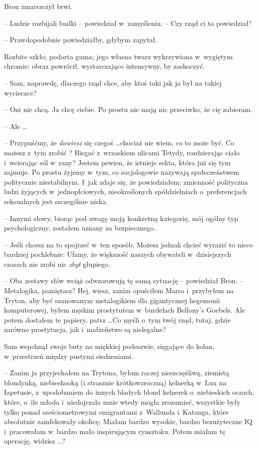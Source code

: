 \documentclass[oneside,polish,11pt,rmheadings]{mwbk}
\begin{document}
Bron zmarszczył brwi. 

-- Ludzie rozbijali budki -- powiedział w~zamyśleniu. -- Czy rząd ci to powiedział? 

-- Prawdopodobnie powiedziałby, gdybym zapytał. 

Rozbite szkło; podarta guma; jego własna twarz wykrzywiona w~wygiętym chromie: obraz powrócił, wystarczająco intensywny, by zaskoczyć.

 -- Sam, naprawdę, dlaczego rząd chce, aby ktoś taki jak ja był na takiej wycieczce? 

-- Oni nie chcą. Ja chcę ciebie. Po prostu nie mają nic przeciwko, że cię zabieram. 

-- Ale \ldots  

-- Przypuśćmy, że \textit{dowiesz } się czegoś \ldots  chociaż nie wiem, co to może być. Co możesz z~tym zrobić ? Biegać z~wrzaskiem ulicami Tetydy, rozdzierając ciało i~wcierając sól w~rany? Jestem pewien, że istnieje sekta, która już się tym zajmuje. Po prostu żyjemy w~tym, co socjologowie nazywają społeczeństwem politycznie niestabilnym. I~jak zdaje się, że powiedziałem: zmienność polityczna ludzi żyjących w~jednopłciowych, nieokreślonych spółdzielniach o~preferencjach seksualnych jest szczególnie niska. 

-- Innymi słowy, biorąc pod uwagę moją konkretną kategorię, mój ogólny typ psychologiczny, zostałem uznany za bezpiecznego. 

-- Jeśli chcesz na to spojrzeć w~ten sposób. Możesz jednak chcieć wyrazić to nieco bardziej pochlebnie: Ufamy, że większość naszych obywateli w~dzisiejszych czasach nie zrobi nic \textit{zbyt } głupiego. 

-- Oba zestawy słów wciąż odwzorowują tę samą sytuację -- powiedział Bron. -- Metalogika, pamiętasz? Hej, wiesz, zanim opuściłem Marsa i~przybyłem na Tryton, aby być szanowanym metalogikiem dla gigantycznej hegemonii komputerowej, byłem męskim prostytutem w~burdelach Bellony's Goebels. Ale potem dostałem te papiery, patrz \ldots  Co myśli o~tym twój rząd, tutaj, gdzie zarówno prostytucja, jak i~małżeństwo są nielegalne? 

Sam wepchnął swoje buty na miękkiej podeszwie, sięgające do kolan, w~przestrzeń między pustymi siedzeniami. 

-- Zanim ja przyjechałem na Trytona, byłam raczej nieszczęśliwą, ziemistą blondynką, niebieskooką (i strasznie krótkowzroczną) kelnerką w~Lux na Iapetusie, z~upodobaniem do innych bladych blond kelnerek o~niebieskich oczach, które, o~ile młoda i~niedojrzała mnie wtedy mogła zrozumieć, wszystkie były tylko ponad sześciometrowymi emigrantami z~Wallunda i~Katanga, które absolutnie zainfekowały okolicę; Miałam bardzo wysokie, bardzo bezużyteczne IQ i~pracowałam w~bardzo mało inspirującym rynsztoku. Potem miałam tę operację, widzisz \ldots ? 
\end{document}

